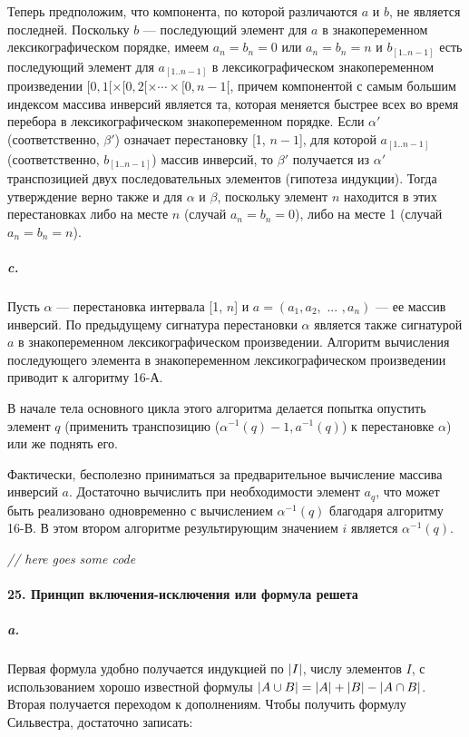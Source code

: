 \documentclass{../../template/mai_book}
\DeclarePairedDelimiter{\abs}{\lvert}{\rvert}
\begin{document}
Теперь предположим, что компонента, по которой различаются $a$ и $b$, не является последней. Поскольку $b$ — последующий элемент для $a$ в знакопеременном лексикографическом порядке, имеем $a_n = b_n = 0$ или $a_n = b_n = n$ и $b_{[1..n - 1]}$ есть последующий элемент для $a_{[1..n - 1]}$ в лексикографическом знакопеременном произведении $[0, 1[ \times [0, 2[ \times \cdots \times [0, n - 1[$, причем компонентой с самым большим индексом массива инверсий является та, которая меняется быстрее всех во время перебора в лексикографическом знакопеременном порядке. Если $\alpha'$ (соответственно, $\beta'$) означает перестановку [1, $n - 1$], для которой $a_{[1..n - 1]}$ (соответственно, $b_{[1..n - 1]}$) массив инверсий, то $\beta'$ получается из $\alpha'$ транспозицией двух последовательных элементов (гипотеза индукции). Тогда утверждение верно также и для $\alpha$ и $\beta$, поскольку элемент $n$ находится в этих перестановках либо на месте $n$ (случай $a_n = b_n = 0$), либо на месте 1 (случай $a_n = b_n = n$).

\subparagraph{c.} Пусть $\alpha$ — перестановка интервала [1, $n$] и $a = (a_1, a_2, \text{ ... }, a_n)$ — ее массив инверсий. По предыдущему сигнатура перестановки $\alpha$ является также сигнатурой $a$ в знакопеременном лексикографическом произведении. Алгоритм вычисления последующего элемента в знакопеременном лексикографическом произведении приводит к алгоритму 16-А.

В начале тела основного цикла этого алгоритма делается попытка опустить элемент $q$ (применить транспозицию ($\alpha^{-1}(q) - 1, a^{-1}(q)$) к перестановке $\alpha$) или же поднять его.

\newpage


Фактически, бесполезно приниматься за предварительное вычисление массива инверсий $a$. Достаточно вычислить при необходимости элемент $a_q$, что может быть реализовано одновременно с вычислением $\alpha^{-1}(q)$ благодаря алгоритму 16-В. В этом втором алгоритме результирующим значением $i$ является $\alpha^{-1}(q)$. \newline

\textit{// here goes some code}

\paragraph{25. Принцип включения-исключения или формула решета}

\subparagraph{a.} Первая формула удобно получается индукцией по $\abs{I}$, числу элементов $I$, с использованием хорошо известной формулы $\abs{A \cup B} = \abs{A} + \abs{B} - \abs{A \cap B}$. Вторая получается переходом к дополнениям. Чтобы получить формулу Сильвестра, достаточно записать:
\end{document}
